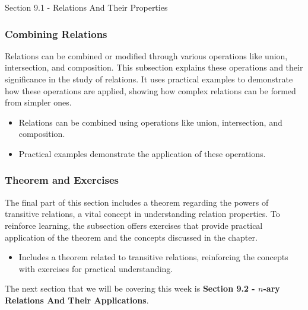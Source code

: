 \begin{notes}{Section 9.1 - Relations And Their Properties}
    \subsubsection*{Combining Relations}
    Relations can be combined or modified through various operations like union, intersection, and composition. This subsection explains these operations and their significance in the study of relations. 
    It uses practical examples to demonstrate how these operations are applied, showing how complex relations can be formed from simpler ones.
    \begin{itemize}
        \item Relations can be combined using operations like union, intersection, and composition.
        \item Practical examples demonstrate the application of these operations.
    \end{itemize}
    
    \subsubsection*{Theorem and Exercises}
    The final part of this section includes a theorem regarding the powers of transitive relations, a vital concept in understanding relation properties. To reinforce learning, the subsection offers 
    exercises that provide practical application of the theorem and the concepts discussed in the chapter.
    \begin{itemize}
        \item Includes a theorem related to transitive relations, reinforcing the concepts with exercises for practical understanding.
    \end{itemize}
\end{notes}

The next section that we will be covering this week is \textbf{Section 9.2 - $n$-ary Relations And Their Applications}.

